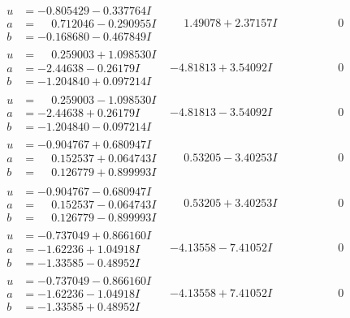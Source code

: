 \documentclass[1p]{elsarticle_modified}
\theoremstyle{definition}
\begin{document}
$$\begin{array}{c|c|c}
\begin{aligned}
u &= -0.805429 - 0.337764 I \\
a &= \phantom{-}0.712046 - 0.290955 I \\
b &= -0.168680 - 0.467849 I\end{aligned}
 & \phantom{-}1.49078 + 2.37157 I & \phantom{-0.000000 } 0 \\ \hline\begin{aligned}
u &= \phantom{-}0.259003 + 1.098530 I \\
a &= -2.44638 - 0.26179 I \\
b &= -1.204840 + 0.097214 I\end{aligned}
 & -4.81813 + 3.54092 I & \phantom{-0.000000 } 0 \\ \hline\begin{aligned}
u &= \phantom{-}0.259003 - 1.098530 I \\
a &= -2.44638 + 0.26179 I \\
b &= -1.204840 - 0.097214 I\end{aligned}
 & -4.81813 - 3.54092 I & \phantom{-0.000000 } 0 \\ \hline\begin{aligned}
u &= -0.904767 + 0.680947 I \\
a &= \phantom{-}0.152537 + 0.064743 I \\
b &= \phantom{-}0.126779 + 0.899993 I\end{aligned}
 & \phantom{-}0.53205 - 3.40253 I & \phantom{-0.000000 } 0 \\ \hline\begin{aligned}
u &= -0.904767 - 0.680947 I \\
a &= \phantom{-}0.152537 - 0.064743 I \\
b &= \phantom{-}0.126779 - 0.899993 I\end{aligned}
 & \phantom{-}0.53205 + 3.40253 I & \phantom{-0.000000 } 0 \\ \hline\begin{aligned}
u &= -0.737049 + 0.866160 I \\
a &= -1.62236 + 1.04918 I \\
b &= -1.33585 - 0.48952 I\end{aligned}
 & -4.13558 - 7.41052 I & \phantom{-0.000000 } 0 \\ \hline\begin{aligned}
u &= -0.737049 - 0.866160 I \\
a &= -1.62236 - 1.04918 I \\
b &= -1.33585 + 0.48952 I\end{aligned}
 & -4.13558 + 7.41052 I & \phantom{-0.000000 } 0\\

\end{array}$$
\end{document}
